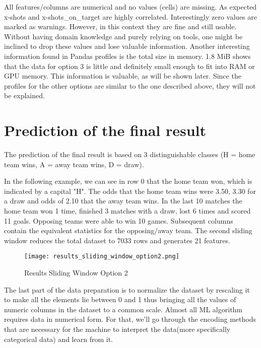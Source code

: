 All features/columns are numerical and no values (cells) are missing. As expected x-shots and x-shots\_on\_target are highly 
correlated. Interestingly zero values are marked as warnings. However, in this context they are fine and still usable. Without having domain knowledge and purely relying on tools, one might be inclined to drop these values and lose valuable information. Another interesting information found in Pandas profiles is the total size in memory. 1.8 MiB shows that the data for option 3 is little and definitely small enough to fit into RAM or GPU memory. This information is valuable, as will be shown later.
\newline
Since the profiles for the other options are similar to the one described above, they will not be explained.


\section {Prediction of the final result}

The prediction of the final result is based on 3 distinguishable classes (H = home team wins, A = away team wins, D = draw).

In the following example, we can see in row 0 that the home team won, which is indicated by a capital "H". The odds that the home team wins were 3.50, 3.30 for a draw and odds of 2.10 that the away team wins. In the last 10 matches the home team won 1 time, finished 3 matches with a draw, lost 6 times and scored 11 goals. Opposing teams were able to win 10 games. Subsequent columns contain the equivalent statistics for the opposing/away team. The second sliding window reduces the total dataset to 7033 rows and generates 21 features.


\begin{figure}[H]
\begin{center}
\texttt{[image: results\_sliding\_window\_option2.png]}
\end{center}
\caption{Results Sliding Window Option 2}
\label{fig:results_sliding_window_option2}
\end{figure}

The last part of the data preparation is to normalize the dataset by rescaling it to make all the elements lie between 0 and 1 thus bringing all the values of numeric columns in the dataset to a common scale. Almost all ML algorithm requires data in numerical form. For that, we'll go through the encoding methods that are necessary for the machine to interpret the data(more specifically categorical data) and learn from it.

